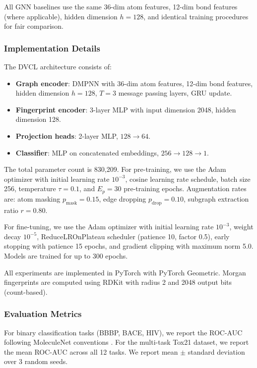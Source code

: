 \documentclass[a4paper,fleqn]{cas-sc}
\begin{document}
All GNN baselines use the same 36-dim atom features, 12-dim bond features (where applicable), hidden dimension $h = 128$, and identical training procedures for fair comparison.

\subsubsection{Implementation Details}

The DVCL architecture consists of:

\begin{itemize}
\item \textbf{Graph encoder}: DMPNN with 36-dim atom features, 12-dim bond features, hidden dimension $h = 128$, $T = 3$ message passing layers, GRU update.
\item \textbf{Fingerprint encoder}: 3-layer MLP with input dimension 2048, hidden dimension 128.
\item \textbf{Projection heads}: 2-layer MLP, $128 \rightarrow 64$.
\item \textbf{Classifier}: MLP on concatenated embeddings, $256 \rightarrow 128 \rightarrow 1$.
\end{itemize}

The total parameter count is 830,209. For pre-training, we use the Adam optimizer with initial learning rate $10^{-3}$, cosine learning rate schedule, batch size 256, temperature $\tau = 0.1$, and $E_p = 30$ pre-training epochs. Augmentation rates are: atom masking $p_{\text{mask}} = 0.15$, edge dropping $p_{\text{drop}} = 0.10$, subgraph extraction ratio $r = 0.80$.

For fine-tuning, we use the Adam optimizer with initial learning rate $10^{-3}$, weight decay $10^{-5}$, ReduceLROnPlateau scheduler (patience 10, factor 0.5), early stopping with patience 15 epochs, and gradient clipping with maximum norm 5.0. Models are trained for up to 300 epochs.

All experiments are implemented in PyTorch with PyTorch Geometric. Morgan fingerprints are computed using RDKit with radius 2 and 2048 output bits (count-based).

\subsubsection{Evaluation Metrics}

For binary classification tasks (BBBP, BACE, HIV), we report the ROC-AUC following MoleculeNet conventions \citep{wu2018moleculenet}. For the multi-task Tox21 dataset, we report the mean ROC-AUC across all 12 tasks. We report mean $\pm$ standard deviation over 3 random seeds.
\end{document}
